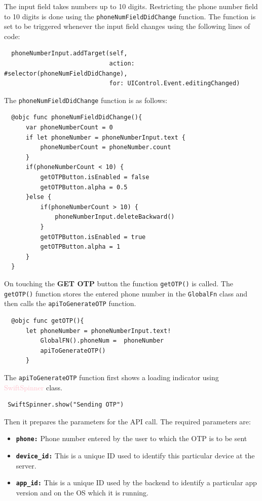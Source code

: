\documentclass[12pt, conference, a4paper]{article}
\begin{document}
\newpage
The input field takes numbers up to 10 digits. Restricting the phone number field to 10 digits is done using the \texttt{phoneNumFieldDidChange} function. The function is set to be triggered whenever the input field changes using the following lines of code:
\begin{verbatim}
  phoneNumberInput.addTarget(self, 
                             action: #selector(phoneNumFieldDidChange), 
                             for: UIControl.Event.editingChanged)
\end{verbatim}
The \texttt{phoneNumFieldDidChange} function is as follows: 
\begin{verbatim}
  @objc func phoneNumFieldDidChange(){
      var phoneNumberCount = 0
      if let phoneNumber = phoneNumberInput.text {
          phoneNumberCount = phoneNumber.count
      }
      if(phoneNumberCount < 10) {
          getOTPButton.isEnabled = false
          getOTPButton.alpha = 0.5
      }else {
          if(phoneNumberCount > 10) {
              phoneNumberInput.deleteBackward()
          }
          getOTPButton.isEnabled = true
          getOTPButton.alpha = 1
      }
  }
\end{verbatim}
On touching the \textbf{GET OTP} button the function \texttt{getOTP()} is called. The \texttt{getOTP()} function stores the entered phone number in the \texttt{GlobalFn} class and then calls the \texttt{apiToGenerateOTP} function. 
\begin{verbatim}
  @objc func getOTP(){
      let phoneNumber = phoneNumberInput.text!
          GlobalFN().phoneNum =  phoneNumber
          apiToGenerateOTP()
      }
\end{verbatim}
The \texttt{apiToGenerateOTP} function first shows a loading indicator using \textcolor{pink}{SwiftSpinner} class. 
\begin{verbatim}
 SwiftSpinner.show("Sending OTP")  
\end{verbatim}
Then it prepares the parameters for the API call. The required parameters are:
\begin{itemize}
  \item \textbf{\texttt{phone:}} Phone number entered by the user to which the OTP is to be sent
  \item \textbf{\texttt{device_id:}} This is a unique ID used to identify this particular device at the server. 
  \item \textbf{\texttt{app_id:}} This is a unique ID used by the backend to identify a particular app version and on the OS which it is running.
\end{itemize}
\end{document}
